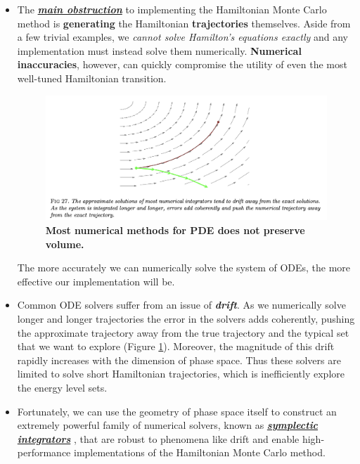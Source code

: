 \documentclass[11pt]{article}
\begin{document}
\begin{itemize}
\item The \underline{\emph{\textbf{main obstruction}}} to implementing the Hamiltonian Monte Carlo method is \textbf{generating} the Hamiltonian \textbf{trajectories} themselves. Aside from a few trivial examples, we \emph{cannot solve Hamilton’s equations exactly} and any implementation must instead solve them numerically. \textbf{Numerical inaccuracies}, however, can quickly compromise the utility of even the most well-tuned Hamiltonian transition. 

\begin{figure}
\begin{minipage}[t]{1\linewidth}
  \centering
  \centerline{\includegraphics[scale = 0.5]{hmc_trajectory_sim_fail.png}}
\end{minipage}
\caption{\footnotesize{\textbf{Most numerical methods for PDE does not preserve volume. \citep{betancourt2017conceptual}}}}
\label{fig: hmc_trajectory_sim_fail}
\end{figure}

The more accurately we can numerically solve the system of ODEs, the more effective our implementation will be.

\item Common ODE solvers suffer from an issue of \emph{\textbf{drift}}. As we numerically solve longer and longer trajectories the error in the solvers adds coherently, pushing the approximate trajectory away from the true trajectory and the typical set that we want to explore (Figure \ref{fig: hmc_trajectory_sim_fail}). Moreover, the magnitude of this drift rapidly increases with the dimension of phase space. Thus these solvers are limited to solve short Hamiltonian trajectories, which is inefficiently explore the energy level sets.

\item Fortunately, we can use the geometry of phase space itself to construct an extremely powerful family of numerical solvers, known as \underline{\emph{\textbf{symplectic integrators}}} \citep{liu2001monte, leimkuhler2004simulating, haier2006geometric, betancourt2017conceptual, vishnoi2021introduction}, that are robust to phenomena like drift and enable high-performance implementations of the Hamiltonian Monte Carlo method.
\end{itemize}
\end{document}
